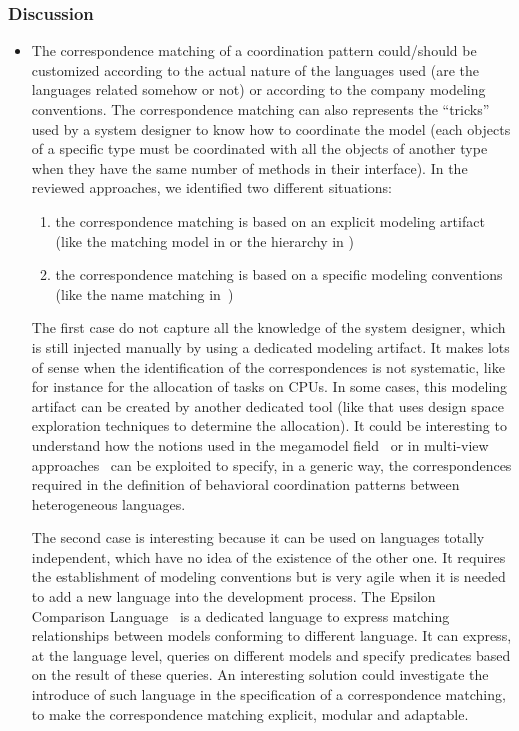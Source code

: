 		\subsubsection{Discussion}
	\begin{itemize}
			\item The correspondence matching of a coordination pattern could/should be customized according to the actual nature of the languages used (\eg are the languages related somehow or not) or according to the company modeling conventions. 
			The correspondence matching can also represents the ``tricks'' used by a system designer to know how to coordinate the model (\eg each objects of a specific type must be coordinated with all the objects of another type when they have the same number of methods in their interface). In the reviewed approaches, we identified two different situations:
			\begin{enumerate}
				\item the correspondence matching is based on an explicit modeling artifact (like the matching model in \cite{MarcoModels2014} or the hierarchy in \cite{modhelxbib,ptolemybib}) 	
				\item the correspondence matching is based on a specific modeling conventions (like the name matching in~\cite{mascotbib})
				\end{enumerate}
				
				The first case do not capture all the knowledge of the system designer, which is still injected manually by using a dedicated modeling artifact. It makes lots of sense when the identification of the correspondences is not systematic, like for instance for the allocation of tasks on CPUs. In some cases, this modeling artifact can be created by another dedicated tool (like \cite{kofman:hal-00950533} that uses design space exploration techniques to determine the allocation). It could be interesting to understand how the notions used in the megamodel field~\cite{megamodel} or in multi-view approaches~\cite{ieee42010} can be exploited to specify, in a generic way, the correspondences required in the definition of behavioral coordination patterns between heterogeneous languages. 
				
				The second case is interesting because it can be used on languages totally independent, \ie which have no idea of the existence of the other one. It requires the establishment of modeling conventions but is very agile when it is needed to add a new language into the development process. The Epsilon Comparison Language~\cite{epsilonbib} is a dedicated language to express matching relationships between models conforming to different language. It can express, at the language level, queries on different models and specify predicates based on the result of these queries. An interesting solution could investigate the introduce of such language in the specification of a correspondence matching,  to make the correspondence matching explicit, modular and adaptable.
				
				\end{itemize}